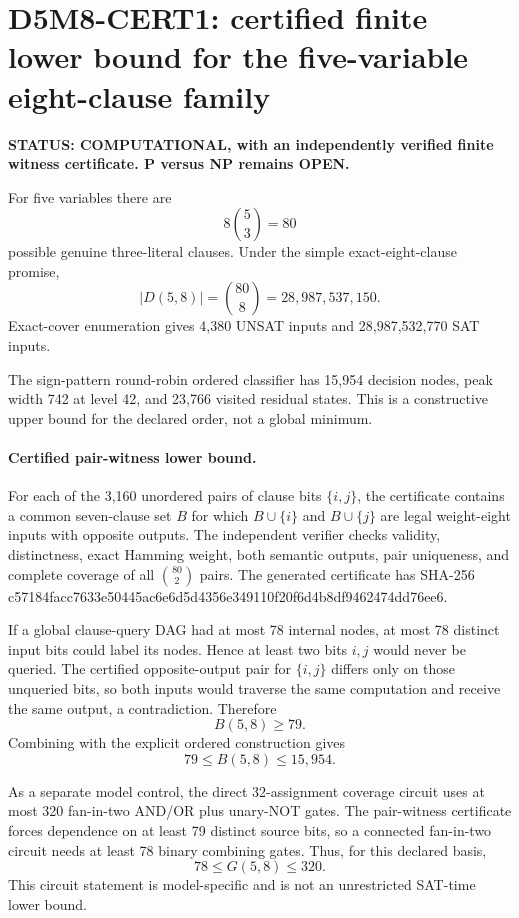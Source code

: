 \section*{D5M8-CERT1: certified finite lower bound for the five-variable eight-clause family}

\textbf{STATUS: COMPUTATIONAL, with an independently verified finite witness certificate. P versus NP remains OPEN.}

For five variables there are
\[
8\binom{5}{3}=80
\]
possible genuine three-literal clauses. Under the simple exact-eight-clause promise,
\[
|D(5,8)|=\binom{80}{8}=28{,}987{,}537{,}150.
\]
Exact-cover enumeration gives 4,380 UNSAT inputs and 28,987,532,770 SAT inputs.

The sign-pattern round-robin ordered classifier has 15,954 decision nodes, peak
width 742 at level 42, and 23,766 visited residual states. This is a constructive
upper bound for the declared order, not a global minimum.

\paragraph{Certified pair-witness lower bound.}
For each of the 3,160 unordered pairs of clause bits \(\{i,j\}\), the certificate
contains a common seven-clause set \(B\) for which \(B\cup\{i\}\) and
\(B\cup\{j\}\) are legal weight-eight inputs with opposite outputs. The
independent verifier checks validity, distinctness, exact Hamming weight, both
semantic outputs, pair uniqueness, and complete coverage of all \(\binom{80}{2}\)
pairs. The generated certificate has SHA-256
c57184facc7633e50445ac6e6d5d4356e349110f20f6d4b8df9462474dd76ee6.

If a global clause-query DAG had at most 78 internal nodes, at most 78 distinct
input bits could label its nodes. Hence at least two bits \(i,j\) would never
be queried. The certified opposite-output pair for \(\{i,j\}\) differs only
on those unqueried bits, so both inputs would traverse the same computation and
receive the same output, a contradiction. Therefore
\[
\boxed{B(5,8)\ge79}.
\]
Combining with the explicit ordered construction gives
\[
\boxed{79\le B(5,8)\le15{,}954}.
\]

As a separate model control, the direct 32-assignment coverage circuit uses at
most 320 fan-in-two AND/OR plus unary-NOT gates. The pair-witness certificate
forces dependence on at least 79 distinct source bits, so a connected fan-in-two
circuit needs at least 78 binary combining gates. Thus, for this declared basis,
\[
78\le G(5,8)\le320.
\]
This circuit statement is model-specific and is not an unrestricted SAT-time
lower bound.

